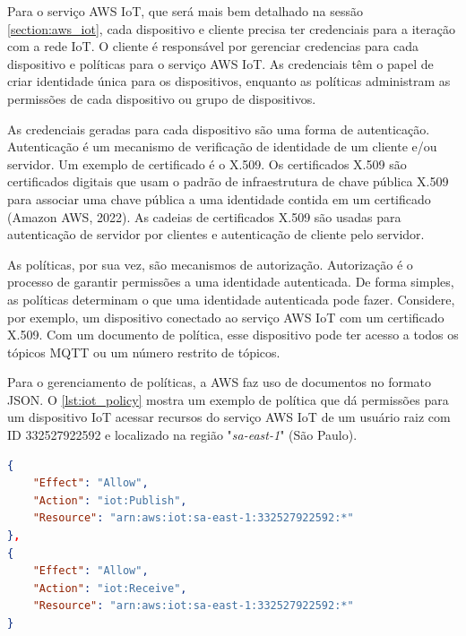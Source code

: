 Para o serviço AWS IoT, que será mais bem detalhado na sessão \autoref{section:aws_iot}, cada dispositivo e cliente precisa ter credenciais para a iteração com a rede IoT. O cliente é responsável por gerenciar credencias para cada dispositivo e políticas para o serviço AWS IoT. As credenciais têm o papel de criar identidade única para os dispositivos, enquanto as políticas administram as permissões de cada dispositivo ou grupo de dispositivos.

As credenciais geradas para cada dispositivo são uma forma de autenticação. Autenticação é um mecanismo de verificação de identidade de um cliente e/ou servidor. Um exemplo de certificado é o X.509. Os certificados X.509 são certificados digitais que usam o padrão de infraestrutura de chave pública X.509 para associar uma chave pública a uma identidade contida em um certificado (Amazon AWS, 2022). As cadeias de certificados X.509 são usadas para autenticação de servidor por clientes e autenticação de cliente pelo servidor.

As políticas, por sua vez, são mecanismos de autorização. Autorização é o processo de garantir permissões a uma identidade autenticada. De forma simples, as políticas determinam o que uma identidade autenticada pode fazer. Considere, por exemplo, um dispositivo conectado ao serviço AWS IoT com um certificado X.509. Com um documento de política, esse dispositivo pode ter acesso a todos os tópicos MQTT ou um número restrito de tópicos.

Para o gerenciamento de políticas, a AWS faz uso de documentos no formato JSON. O \autoref{lst:iot_policy} mostra um exemplo de política que dá permissões para um dispositivo IoT acessar recursos do serviço AWS IoT de um usuário raiz com ID 332527922592 e localizado na região "\textit{sa-east-1}" (São Paulo).

\begin{lstlisting}[float=htbp,language=json,firstnumber=1,caption={Exemplo de uma política dando permissões de uso do serviço AWS IoT para um dispositivo IoT.},label=lst:iot_policy]
{
    "Effect": "Allow",
    "Action": "iot:Publish",
    "Resource": "arn:aws:iot:sa-east-1:332527922592:*"
},
{
    "Effect": "Allow",
    "Action": "iot:Receive",
    "Resource": "arn:aws:iot:sa-east-1:332527922592:*"
}
\end{lstlisting}

